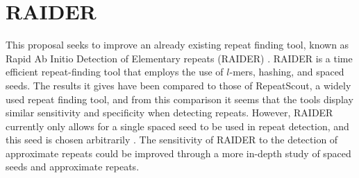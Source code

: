 \section{RAIDER}

This proposal seeks to improve an already existing repeat finding tool, known as Rapid Ab Initio Detection of Elementary repeats (RAIDER) \cite{figueroa2013raider}. RAIDER is a time efficient repeat-finding tool that employs the use of $l$-mers, hashing, and spaced seeds. The results it gives have been compared to those of RepeatScout, a widely used repeat finding tool, and from this comparison it seems that the tools display similar sensitivity and specificity when detecting repeats. However, RAIDER currently only allows for a single spaced seed to be used in repeat detection, and this seed is chosen arbitrarily \cite{figueroa2013raiderpaper}. The sensitivity of RAIDER to the detection of approximate repeats could be improved through a more in-depth study of spaced seeds and approximate repeats.